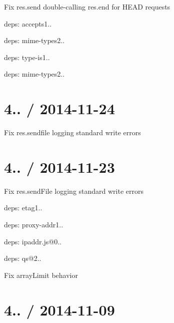 \begin{DoxyItemize}
\item Fix {\ttfamily res.\+send} double-\/calling {\ttfamily res.\+end} for {\ttfamily H\+E\+A\+D} requests
\item deps\+: accepts1..
\begin{DoxyItemize}
\item deps\+: mime-\/types2..
\end{DoxyItemize}
\item deps\+: type-\/is1..
\begin{DoxyItemize}
\item deps\+: mime-\/types2..
\end{DoxyItemize}
\end{DoxyItemize}

\section*{4.. / 2014-\/11-\/24 }


\begin{DoxyItemize}
\item Fix {\ttfamily res.\+sendfile} logging standard write errors
\end{DoxyItemize}

\section*{4.. / 2014-\/11-\/23 }


\begin{DoxyItemize}
\item Fix {\ttfamily res.\+send\+File} logging standard write errors
\item deps\+: etag1..
\item deps\+: proxy-\/addr1..
\begin{DoxyItemize}
\item deps\+: ipaddr.\+js@0..
\end{DoxyItemize}
\item deps\+: qs@2..
\begin{DoxyItemize}
\item Fix {\ttfamily array\+Limit} behavior
\end{DoxyItemize}
\end{DoxyItemize}

\section*{4.. / 2014-\/11-\/09 }



